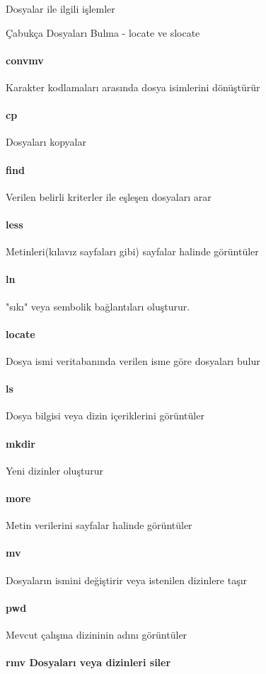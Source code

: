 \documentclass[10pt,a5paper]{book}
\begin{document}
\begin{section}{Dosyalar ile ilgili işlemler}
\begin{subsection}{Çabukça Dosyaları Bulma - locate ve slocate}
\paragraph{convmv}{	Karakter kodlamaları arasında dosya isimlerini dönüştürür}
\paragraph{cp}{	Dosyaları kopyalar}
\paragraph{find}{	Verilen belirli kriterler ile eşleşen dosyaları arar}
\paragraph{less}{	Metinleri(kılavız sayfaları gibi) sayfalar halinde görüntüler}
\paragraph{ln}{	"sıkı" veya sembolik bağlantıları oluşturur.}
\paragraph{locate}{	Dosya ismi veritabanında verilen isme göre dosyaları bulur}
\paragraph{ls}{	Dosya bilgisi veya dizin içeriklerini görüntüler}
\paragraph{mkdir}{	Yeni dizinler oluşturur}
\paragraph{more}{	Metin verilerini sayfalar halinde görüntüler}
\paragraph{mv}{	Dosyaların ismini değiştirir veya istenilen dizinlere taşır}
\paragraph{pwd}{	Mevcut çalışma dizininin adını görüntüler}
\paragraph{rmv	Dosyaları veya dizinleri siler}

\end{subsection}
\end{section}
\end{document}
